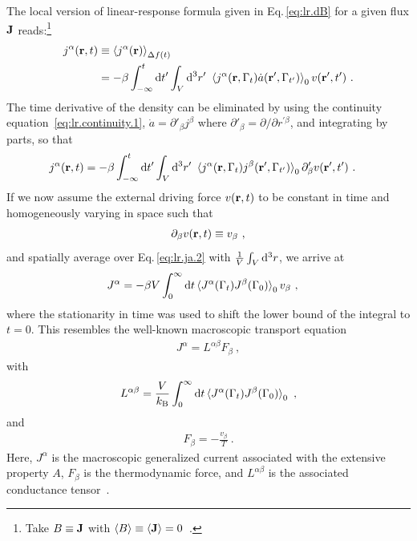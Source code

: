 The local version of linear-response formula given in Eq.\,\eqref{eq:lr.dB} for a given flux $\bf J$ reads:\footnote{Take \mbox{$B \equiv {\bf J}$} with $\braket{B} \equiv \braket{{\bf J}} = 0$~.}
\begin{align}
j^\alpha (\b r , t) 
	& \equiv \braket{j^\alpha (\b r)}_{\Delta f (t)} \\
	&= - \beta \int_{-\infty}^{t} \d t' \int_V \d^3 r' ~ \braket{
			j^\alpha (\b r, \Gamma_t) \dot{a} (\b r', \Gamma_{t'})
		}_0 v (\b r', t')~.
	\label{eq:lr.ja.1}
\end{align}
The time derivative of the density can be eliminated by using the continuity equation~\eqref{eq:lr.continuity.1}, $\dot a = \partial'_\beta j^\beta$ where $\partial'_\beta = \partial/\partial r^{\prime \beta}$, and integrating by parts, so that
\begin{align}
j^\alpha (\b r , t) 
&= - \beta \int_{-\infty}^{t} \d t' \int_V \d^3 r' ~ \braket{
	j^\alpha (\b r, \Gamma_t) j^\beta (\b r', \Gamma_{t'})
}_0 \partial'_\beta v (\b r', t')~.
\label{eq:lr.ja.2}
\end{align}
If we now assume the external driving force $v ({\bf r}, t)$ to be constant in time and homogeneously varying in space such that
\begin{align}
	\partial_\beta v (\b r, t) \equiv v_\beta~,
	\label{eq:lr.force}
\end{align}
and spatially average over Eq.\,\eqref{eq:lr.ja.2} with $\frac{1}{V} \int_V {\rm d}^3 r$, we arrive at
\begin{align}
	J^\alpha 
		&= -\beta V \int_{0}^{\infty} 
		\d t
		\braket{
		J^\alpha (\Gamma_t) J^\beta (\Gamma_{0})
	}_0 
	v_\beta~,
	\label{eq:lr.J}
\end{align}
where the stationarity in time was used to shift the lower bound of the integral to $t=0$.
This resembles the well-known macroscopic transport equation
\begin{align}
	J^\alpha =  L^{\alpha \beta} F_\beta~,
		\label{eq:lr.LF}
\end{align}
with
\begin{align}
	L^{\alpha \beta}
		= \frac{V}{k_{\rm B}} \int_{0}^{\infty} 
		\d t \braket{J^\alpha (\Gamma_t) J^\beta (\Gamma_{0})}_0 ~,
	\label{eq:lr.L}
\end{align}
and
\begin{align}
	F_\beta
		= - \frac{v_\beta}{T}~.
	\label{eq:lr.F}
\end{align}
Here, $J^\alpha$ is the macroscopic generalized current associated with the extensive property $A$, $F_\beta$ is the thermodynamic force, and $L^{\alpha \beta}$ is the associated conductance tensor~\cite{Onsager1931a,Baroni2020a}.

